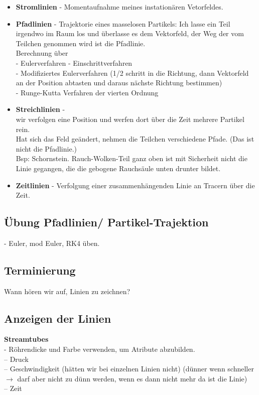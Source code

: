 \documentclass{article}
\begin{document}
\begin{itemize}[noitemsep]
	\item \textbf{Stromlinien} - Momentaufnahme meines instationären Vetorfeldes.\\
	\item \textbf{Pfadlinien} -  Trajektorie eines masselosen Partikels: Ich lasse ein Teil irgendwo im Raum los und überlasse es dem Vektorfeld, der Weg der vom Teilchen genommen wird ist die Pfadlinie.\\
	Berechnung über\\
	- Eulerverfahren - Einschrittverfahren\\
	- Modifiziertes Eulerverfahren (1/2 schritt in die Richtung, dann Vektorfeld an der Position abtasten und daraus nächste Richtung bestimmen)\\
	- Runge-Kutta Verfahren der vierten Ordnung\\
	\item \textbf{Streichlinien} - \\
	wir verfolgen eine Position und werfen dort über die Zeit mehrere Partikel rein.\\
	Hat sich das Feld geändert, nehmen die Teilchen verschiedene Pfade.	(Das ist nicht die Pfadlinie.)\\
	Bsp: Schornstein. Rauch-Wolken-Teil ganz oben ist mit Sicherheit nicht die Linie gegangen, die die gebogene Rauchsäule unten drunter bildet.\\
	
	\item \textbf{Zeitlinien} - Verfolgung einer zusammenhängenden Linie an Tracern über die Zeit.
\end{itemize}


\subsection{Übung Pfadlinien/ Partikel-Trajektion}
- Euler, mod Euler, RK4 üben.\\

\subsection{Terminierung}
Wann hören wir auf, Linien zu zeichnen?\\

\subsection{Anzeigen der Linien}
\textbf{Streamtubes}\\
- Röhrendicke und Farbe verwenden, um Atribute abzubilden.\\
-- Druck\\
-- Geschwindigkeit (hätten wir bei einzelnen Linien nicht) (dünner wenn schneller $\rightarrow$ darf aber nicht zu dünn werden, wenn es dann nicht mehr da ist die Linie)\\
-- Zeit\\
\end{document}
